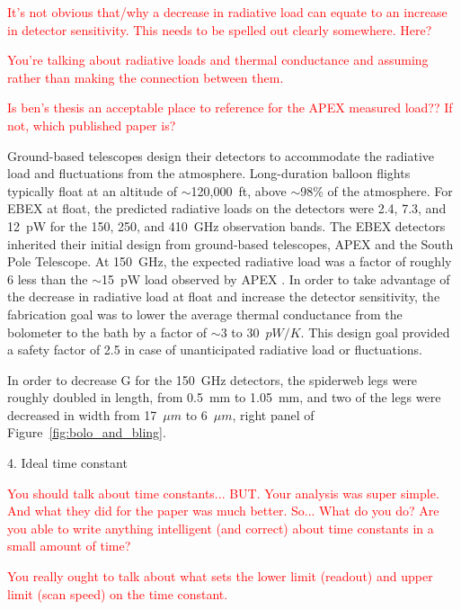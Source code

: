 \textcolor{red}{It's not obvious that/why a decrease in radiative load can equate to an increase in detector sensitivity. This needs to be spelled out clearly somewhere. Here?}

\textcolor{red}{You're talking about radiative loads and thermal conductance and assuming rather than making the connection between them.}

\textcolor{red}{%
Is ben's thesis an acceptable place to reference for the APEX measured load?? If not, which published paper is?}

Ground-based telescopes design their detectors to accommodate the radiative load and fluctuations from the atmosphere. 
Long-duration balloon flights typically float at an altitude of $\sim$120,000~ft, above $\sim$98\% of the atmosphere. 
For \ac{EBEX} at float, the predicted radiative loads on the detectors were 2.4, 7.3, and 12~pW for the 150, 250, and 410~GHz observation bands. 
The \ac{EBEX} detectors inherited their initial design from ground-based telescopes, \ac{APEX} and the South Pole Telescope. 
At 150~GHz, the expected radiative load was a factor of roughly 6 less than the $\sim$15~pW load observed by \ac{APEX} \cite{Westbrook2014}. 
In order to take advantage of the decrease in radiative load at float and increase the detector sensitivity, the fabrication goal was to lower the average thermal conductance from the bolometer to the bath by a factor of $\sim$3 to 30~$pW/K$. 
This design goal provided a safety factor of 2.5 in case of unanticipated radiative load or fluctuations.

In order to decrease G for the 150~GHz detectors, the spiderweb legs were roughly doubled in length, from 0.5~mm to 1.05~mm, and two of the legs were decreased in width from 17~$\mu m$ to 6~$\mu m$, right panel of Figure~\ref{fig:bolo_and_bling}. 



4. Ideal time constant

\textcolor{red}{You should talk about time constants... BUT. Your analysis was super simple. And what they did for the paper was much better. So... What do you do? Are you able to write anything intelligent (and correct) about time constants in a small amount of time?}

\textcolor{red}{You really ought to talk about what sets the lower limit (readout) and upper limit (scan speed) on the time constant.}

